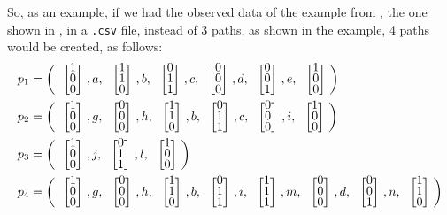 So, as an example, if we had the observed data of the example from
\cite{moreira2018enhanced}, the one shown in , in a
\verb|.csv| file, instead of 3 paths, as shown in the example, 4 paths would be
created, as follows:
\setlength\arraycolsep{2pt}
\begin{align*}
  p_1&= \left(\colvec{1\\0\\0},a,\colvec{1\\1\\0},b,\colvec{0\\1\\1},c,\colvec{0\\0\\0},d,\colvec{0\\0\\1},e,\colvec{1\\0\\0}\right) \\
  p_2&= \left(\colvec{1\\0\\0},g,\colvec{0\\0\\0},h,\colvec{1\\1\\0},b,\colvec{0\\1\\1},c,\colvec{0\\0\\0},i,\colvec{1\\0\\0}\right) \\
  p_3&= \left(\colvec{1\\0\\0},j,\colvec{0\\1\\1},l,\colvec{1\\0\\0}\right) \\
  p_4&= \left(\colvec{1\\0\\0},g,\colvec{0\\0\\0},h,\colvec{1\\1\\0},b,\colvec{0\\1\\1},i,\colvec{1\\1\\1},m,\colvec{0\\0\\0},d,\colvec{0\\0\\1},n,\colvec{1\\1\\0}\right) \\
\end{align*}
